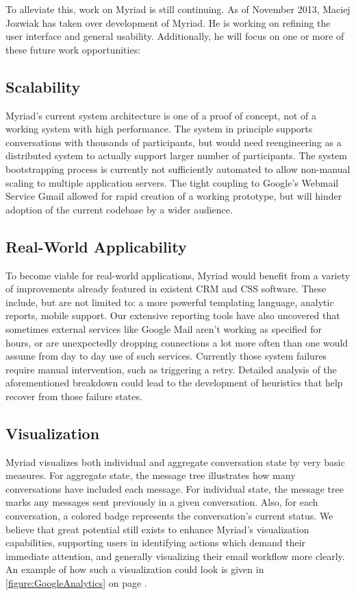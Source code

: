 To alleviate this, work on Myriad is still continuing. As of November 2013, Maciej Jozwiak has taken over development of Myriad. He is working on refining the user interface and general usability. Additionally, he will focus on one or more of these future work opportunities:

\subsection{Scalability}

Myriad’s current system architecture is one of a proof of concept, not of a working system with high performance. The system in principle supports conversations with thousands of participants, but would need reengineering as a distributed system to actually support larger number of participants.
The system bootstrapping process is currently not sufficiently automated to allow non-manual scaling to multiple application servers.
The tight coupling to Google’s Webmail Service Gmail allowed for rapid creation of a working prototype, but will hinder adoption of the current codebase by a wider audience.

\subsection{Real-World Applicability}

To become viable for real-world applications, Myriad would benefit from a variety of improvements already featured in existent CRM and CSS software. These include, but are not limited to: a more powerful templating language, analytic reports, mobile support. Our extensive reporting tools have also uncovered that sometimes external services like Google Mail aren't working as specified for hours, or are unexpectedly dropping connections a lot more often than one would assume from day to day use of such services. Currently those system failures require manual intervention, such as triggering a retry. Detailed analysis of the aforementioned breakdown could lead to the development of heuristics that help recover from those failure states.

\subsection{Visualization}

Myriad visualizes both individual and aggregate conversation state by very basic measures. For aggregate state, the message tree illustrates how many conversations have included each message. For individual state, the message tree marks any messages sent previously in a given conversation. Also, for each conversation, a colored badge represents the conversation's current status. We believe that great potential still exists to enhance Myriad's visualization capabilities, supporting users in identifying actions which demand their immediate attention, and generally visualizing their email workflow more clearly. An example of how such a visualization could look is given in \autoref{figure:GoogleAnalytics} on page \pageref{figure:GoogleAnalytics}.


